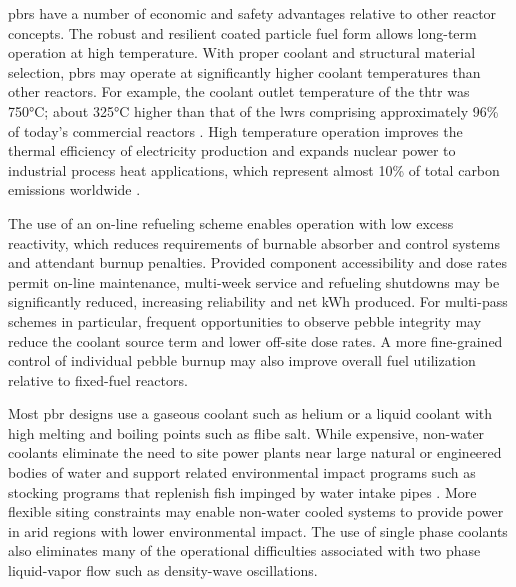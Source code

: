 \glspl{pbr} have a number of economic and safety advantages relative to other reactor concepts. The robust and resilient coated particle fuel form allows long-term operation at high temperature. With proper coolant and structural material selection, \glspl{pbr} may operate at significantly higher coolant temperatures than other reactors. For example, the coolant outlet temperature of the \gls{thtr} was 750\si{\celsius}; about 325\si{\celsius} higher than that of the \glspl{lwr} comprising approximately 96\% of today's commercial reactors \cite{reactor_count}. High temperature operation improves the thermal efficiency of electricity production and expands nuclear power to industrial process heat applications, which represent almost 10\% of total carbon emissions worldwide \cite{friedmann}.

The use of an on-line refueling scheme enables operation with low excess reactivity, which reduces requirements of burnable absorber and control systems and attendant burnup penalties. Provided component accessibility and dose rates permit on-line maintenance, multi-week service and refueling shutdowns may be significantly reduced, increasing reliability and net kWh produced. For multi-pass schemes in particular, frequent opportunities to observe pebble integrity may reduce the coolant source term and lower off-site dose rates. A more fine-grained control of individual pebble burnup may also improve overall fuel utilization relative to fixed-fuel reactors.

Most \gls{pbr} designs use a gaseous coolant such as helium or a liquid coolant with high melting and boiling points such as \gls{flibe} salt. While expensive, non-water coolants eliminate the need to site power plants near large natural or engineered bodies of water and support related environmental impact programs such as stocking programs that replenish fish impinged by water intake pipes \cite{exelon_fish}.
More flexible siting constraints may enable non-water cooled systems to provide power in arid regions with lower environmental impact.
The use of single phase coolants also eliminates many of the operational difficulties associated with two phase liquid-vapor flow such as density-wave oscillations.

